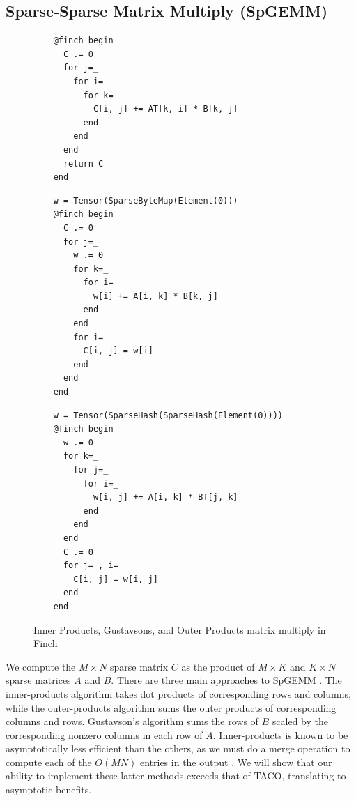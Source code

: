 \subsection{Sparse-Sparse Matrix Multiply (SpGEMM)}
\begin{figure}
    \begin{minipage}{0.333\linewidth}
    \begin{verbatim}
    @finch begin
      C .= 0
      for j=_
        for i=_
          for k=_
            C[i, j] += AT[k, i] * B[k, j]
          end
        end
      end
      return C
    end
    \end{verbatim}
    \end{minipage}%
    \begin{minipage}{0.333\linewidth}
    \begin{verbatim}
    w = Tensor(SparseByteMap(Element(0)))
    @finch begin
      C .= 0
      for j=_
        w .= 0
        for k=_
          for i=_
            w[i] += A[i, k] * B[k, j]
          end
        end
        for i=_
          C[i, j] = w[i]
        end
      end
    end
    \end{verbatim}
    \end{minipage}%
    \begin{minipage}{0.333\linewidth}
    \begin{verbatim}
    w = Tensor(SparseHash(SparseHash(Element(0))))
    @finch begin
      w .= 0
      for k=_
        for j=_
          for i=_
            w[i, j] += A[i, k] * BT[j, k]
          end
        end
      end
      C .= 0
      for j=_, i=_
        C[i, j] = w[i, j]
      end
    end
    \end{verbatim}
    \end{minipage}
    \vspace{-12pt}
    \caption{Inner Products, Gustavsons, and Outer Products matrix multiply in Finch}\label{fig:spgemm_listing}
    \vspace{-12pt}
\end{figure}

We compute the $M \times N$ sparse matrix $C$ as the product of $M \times K$ and $K \times N$ sparse matrices $A$ and $B$.
%
There are three main approaches to SpGEMM \cite[Section 2.2]{zhang2021gamma}.
%
The inner-products algorithm takes dot products of corresponding rows and columns, while the outer-products algorithm sums the outer products of corresponding columns and rows.
%
Gustavson's algorithm sums the rows of $B$ scaled by the corresponding nonzero columns in each row of $A$.
%
Inner-products is known to be asymptotically less efficient than the others, as we must do a merge operation to compute each of the $O(MN)$ entries in the output \cite{ahrens2022autoscheduling}.
%
We will show that our ability to implement these latter methods exceeds that of TACO, translating to asymptotic benefits. 
% 


